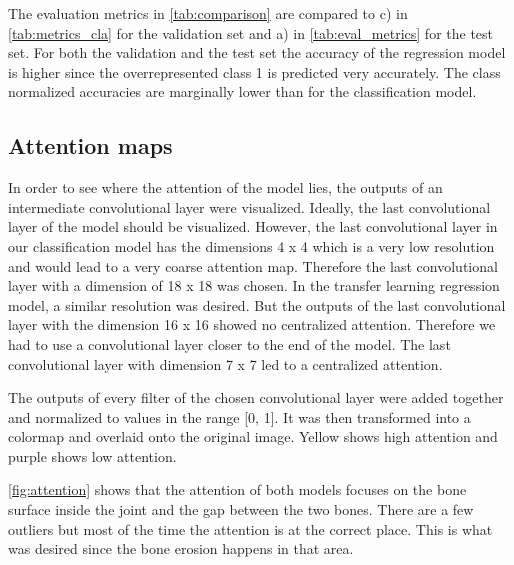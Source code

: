 \documentclass[12pt]{article}
\begin{document}
The evaluation metrics in \autoref{tab:comparison} are compared to c) in \autoref{tab:metrics_cla} for the validation set and a) in \autoref{tab:eval_metrics} for the test set. For both the validation and the test set the accuracy of the regression model is higher since the overrepresented class 1 is predicted very accurately. The class normalized accuracies are marginally lower than for the classification model.

\subsection{Attention maps}
\label{subsec:attention}

In order to see where the attention of the model lies, the outputs of an intermediate convolutional layer were visualized. Ideally, the last convolutional layer of the model should be visualized. However, the last convolutional layer in our classification model has the dimensions 4 x 4 which is a very low resolution and would lead to a very coarse attention map. Therefore the last convolutional layer with a dimension of 18 x 18 was chosen. In the transfer learning regression model, a similar resolution was desired. But the outputs of the last convolutional layer with the dimension 16 x 16 showed no centralized attention. Therefore we had to use a convolutional layer closer to the end of the model. The last convolutional layer with dimension 7 x 7 led to a centralized attention.

The outputs of every filter of the chosen convolutional layer were added together and normalized to values in the range [0, 1]. It was then transformed into a colormap and overlaid onto the original image. Yellow shows high attention and purple shows low attention.

\autoref{fig:attention} shows that the attention of both models focuses on the bone surface inside the joint and the gap between the two bones. There are a few outliers but most of the time the attention is at the correct place. This is what was desired since the bone erosion happens in that area.
\end{document}
